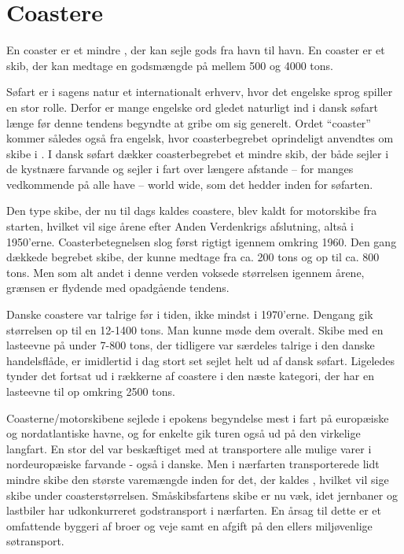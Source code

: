 \part{Coastere}\label{coastere}

En coaster er et mindre , der
kan sejle gods fra havn til havn. En coaster er et skib, der kan medtage
en godsmængde på mellem 500 og 4000 tons.

Søfart er i sagens natur et internationalt erhverv, hvor det engelske
sprog spiller en stor rolle. Derfor er mange engelske ord gledet naturligt
ind i dansk søfart længe før denne tendens begyndte at gribe om sig
generelt. Ordet ``coaster'' kommer således også fra engelsk, hvor
coasterbegrebet oprindeligt anvendtes om skibe i .  I dansk søfart dækker
coasterbegrebet et mindre skib, der både sejler i de kystnære farvande og
sejler i fart over længere afstande -- for manges vedkommende på alle have
-- world wide, som det hedder inden for søfarten. 

Den type skibe, der nu til dags kaldes coastere, blev kaldt for motorskibe
fra starten, hvilket vil sige årene efter Anden Verdenkrigs afslutning,
altså i 1950'erne.  Coasterbetegnelsen slog først rigtigt igennem omkring
1960. Den gang dækkede begrebet skibe, der kunne medtage fra ca. 200 tons
og op til ca.  800 tons. Men som alt andet i denne verden voksede
størrelsen igennem årene, grænsen er flydende med opadgående tendens. 

Danske coastere var talrige før i tiden, ikke mindst i 1970'erne. Dengang
gik størrelsen op til en 12-1400 tons. Man kunne møde dem overalt. Skibe
med en lasteevne på under 7-800 tons, der tidligere var særdeles talrige
i den danske handelsflåde, er imidlertid i dag stort set sejlet helt ud af
dansk søfart. Ligeledes tynder det fortsat ud i rækkerne af coastere i den
næste kategori, der har en lasteevne til op omkring 2500 tons.

Coasterne/motorskibene sejlede i epokens begyndelse mest i fart på
europæiske og nordatlantiske havne, og for enkelte gik turen også ud på
den virkelige langfart. En stor del var beskæftiget med at transportere
alle mulige varer i nordeuropæiske farvande - også i danske. Men i
nærfarten transporterede lidt mindre skibe den største varemængde inden
for det, der kaldes , hvilket vil sige skibe under
coasterstørrelsen. Småskibsfartens skibe er nu væk, idet jernbaner og
lastbiler har udkonkurreret godstransport i nærfarten. En årsag til dette
er et omfattende byggeri af broer og veje samt en afgift på den ellers
miljøvenlige søtransport. 

